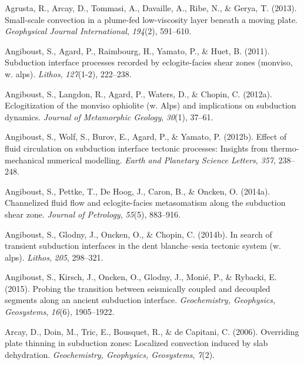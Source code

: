 \begin{CSLReferences}{1}{1}
\leavevmode{}%
Agrusta, R., Arcay, D., Tommasi, A., Davaille, A., Ribe, N., \& Gerya, T. (2013). Small-scale convection in a plume-fed low-viscosity layer beneath a moving plate. \emph{Geophysical Journal International}, \emph{194}(2), 591--610.

\leavevmode{}%
Angiboust, S., Agard, P., Raimbourg, H., Yamato, P., \& Huet, B. (2011). Subduction interface processes recorded by eclogite-facies shear zones (monviso, w. alps). \emph{Lithos}, \emph{127}(1-2), 222--238.

\leavevmode{}%
Angiboust, S., Langdon, R., Agard, P., Waters, D., \& Chopin, C. (2012a). Eclogitization of the monviso ophiolite (w. Alps) and implications on subduction dynamics. \emph{Journal of Metamorphic Geology}, \emph{30}(1), 37--61.

\leavevmode{}%
Angiboust, S., Wolf, S., Burov, E., Agard, P., \& Yamato, P. (2012b). Effect of fluid circulation on subduction interface tectonic processes: Insights from thermo-mechanical numerical modelling. \emph{Earth and Planetary Science Letters}, \emph{357}, 238--248.

\leavevmode{}%
Angiboust, S., Pettke, T., De Hoog, J., Caron, B., \& Oncken, O. (2014a). Channelized fluid flow and eclogite-facies metasomatism along the subduction shear zone. \emph{Journal of Petrology}, \emph{55}(5), 883--916.

\leavevmode{}%
Angiboust, S., Glodny, J., Oncken, O., \& Chopin, C. (2014b). In search of transient subduction interfaces in the dent blanche--sesia tectonic system (w. alps). \emph{Lithos}, \emph{205}, 298--321.

\leavevmode{}%
Angiboust, S., Kirsch, J., Oncken, O., Glodny, J., Monié, P., \& Rybacki, E. (2015). Probing the transition between seismically coupled and decoupled segments along an ancient subduction interface. \emph{Geochemistry, Geophysics, Geosystems}, \emph{16}(6), 1905--1922.

\leavevmode{}%
Arcay, D., Doin, M., Tric, E., Bousquet, R., \& de Capitani, C. (2006). Overriding plate thinning in subduction zones: Localized convection induced by slab dehydration. \emph{Geochemistry, Geophysics, Geosystems}, \emph{7}(2).


\end{CSLReferences}
